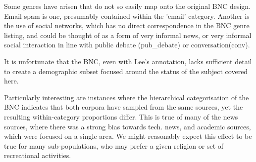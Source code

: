 Some genres have arisen that do not so easily map onto the original BNC design.  Email spam is one, presumably contained within the 'email' category.  Another is the use of social networks, which has no direct correspondence in the BNC genre listing, and could be thought of as a form of very informal news, or very informal social interaction in line with public debate (pub\_debate) or conversation(conv).









It is unfortunate that the BNC, even with Lee's annotation, lacks sufficient detail to create a demographic subset focused around the status of the subject covered here.


Particularly interesting are instances where the hierarchical categorisation of the BNC indicates that both corpora have sampled from the same sources, yet the resulting within-category proportions differ.  This is true of many of the news sources, where there was a strong bias towards tech. news, and academic sources, which were focused on a single area.  We might reasonably expect this effect to be true for many sub-populations, who may prefer a given religion or set of recreational activities.  


